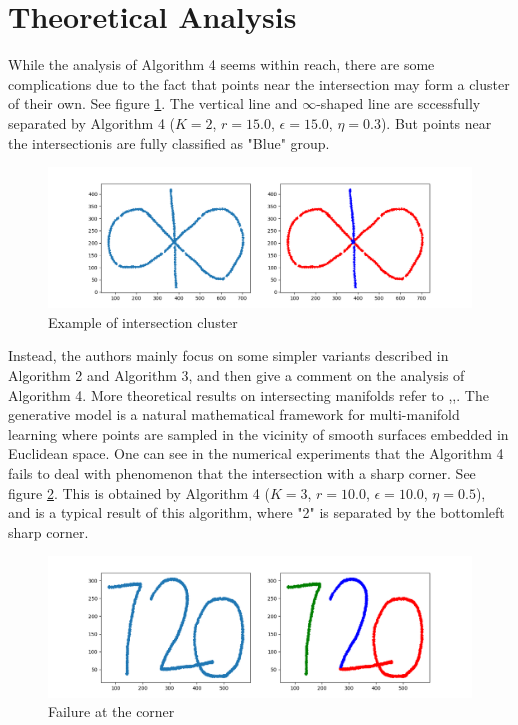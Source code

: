 \documentclass[11pt,reqno]{amsart}
\numberwithin{equation}{section}
\theoremstyle{plain}
\begin{document}
\section{Theoretical Analysis}
While the analysis of Algorithm 4 seems within reach, there are some complications due to
the fact that points near the intersection may form a cluster of their own. See figure \ref{fig1}.
The vertical line and $\infty$-shaped line are sccessfully separated by Algorithm 4 ($K = 2$, $r = 15.0$, $\epsilon = 15.0$, $\eta = 0.3$).
But points near the intersectionis are fully classified as "Blue" group. 
\begin{figure}[htbp]
\centering
\vspace{-1em}
\includegraphics[width=1.0  \textwidth]{infinity_shape.png}
\vspace{-2em}
\caption{Example of intersection cluster}
\label{fig1}
\end{figure}

Instead, the authors mainly focus on some simpler variants described in Algorithm 2
and Algorithm 3, and then give a comment on the analysis of Algorithm 4. More theoretical results on intersecting manifolds 
refer to \cite{EAC},\cite{GCGL},\cite{MSEJC}. The generative model is a natural mathematical framework for multi-manifold learning where points are sampled in the vicinity of smooth surfaces embedded in Euclidean
space. One can see in the numerical experiments that the Algorithm 4 fails to deal with phenomenon that the intersection with a sharp corner. See figure \ref{fig2}. This is obtained by  Algorithm 4  ($K = 3$, $r = 10.0$, $\epsilon = 10.0$, $\eta = 0.5$), and is a typical result of this algorithm, where "2" is separated by the bottomleft sharp corner.
\begin{figure}[htbp]
\centering
\vspace{-1em}
\includegraphics[width=1.0  \textwidth]{sharp_720.png}
\vspace{-2em}
\caption{Failure at the corner}
\label{fig2}
\end{figure}
\end{document}
